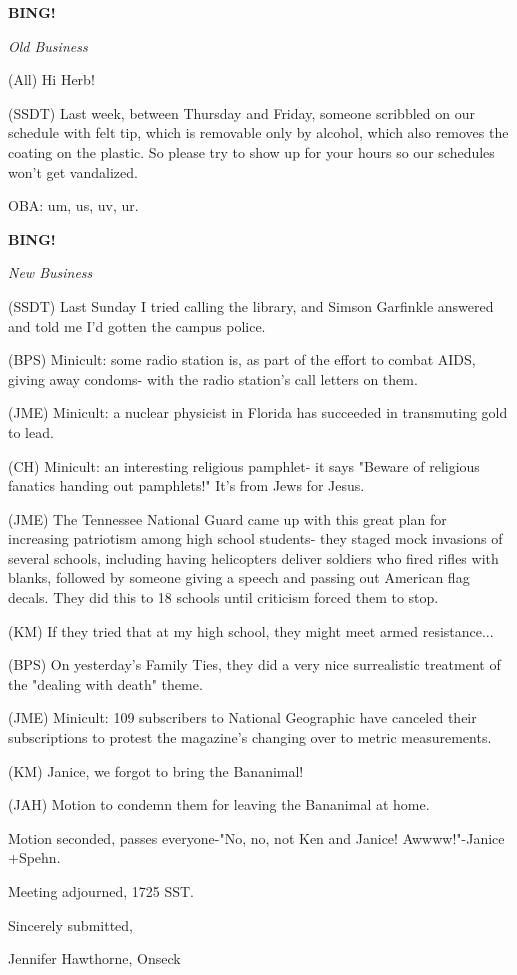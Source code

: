 \documentclass[12pt]{article}
\newcommand{\bing}{{\bf BING!} }
\newcommand{\goto}[1]{\bing \vskip 12pt \centerline{{\em{#1}}}}
\begin{document}
\goto{Old Business}

(All) Hi Herb!

(SSDT) Last week, between Thursday and Friday, someone scribbled on our schedule with felt tip, which is removable only by alcohol, which also removes the coating on the plastic. So please try to show up for your hours so our schedules won't get vandalized.

OBA: um, us, uv, ur.

\goto{New Business}

(SSDT) Last Sunday I tried calling the library, and Simson Garfinkle answered and told me I'd gotten the campus police.

(BPS) Minicult: some radio station is, as part of the effort to combat AIDS, giving away condoms- with the radio station's call letters on them.

(JME) Minicult: a nuclear physicist in Florida has succeeded in transmuting gold to lead.

(CH) Minicult: an interesting religious pamphlet- it says "Beware of religious fanatics handing out pamphlets!" It's from Jews for Jesus.

(JME) The Tennessee National Guard came up with this great plan for increasing patriotism among high school students- they staged mock invasions of several schools, including having helicopters deliver soldiers who fired rifles with blanks, followed by someone giving a speech and passing out American flag decals. They did this to 18 schools until criticism forced them to stop.

(KM) If they tried that at my high school, they might meet armed resistance...

(BPS) On yesterday's Family Ties, they did a very nice surrealistic treatment of the "dealing with death" theme.

(JME) Minicult: 109 subscribers to National Geographic have canceled their subscriptions to protest the magazine's changing over to metric measurements.

(KM) Janice, we forgot to bring the Bananimal!

(JAH) Motion to condemn them for leaving the Bananimal at home.

Motion seconded, passes everyone-"No, no, not Ken and Janice! Awwww!"-Janice +Spehn.

\vspace{12pt}

\noindent
Meeting adjourned, 1725 SST.

\vspace{18pt}

\centerline{Sincerely submitted,}
\centerline{Jennifer Hawthorne, Onseck}
\end{document}

